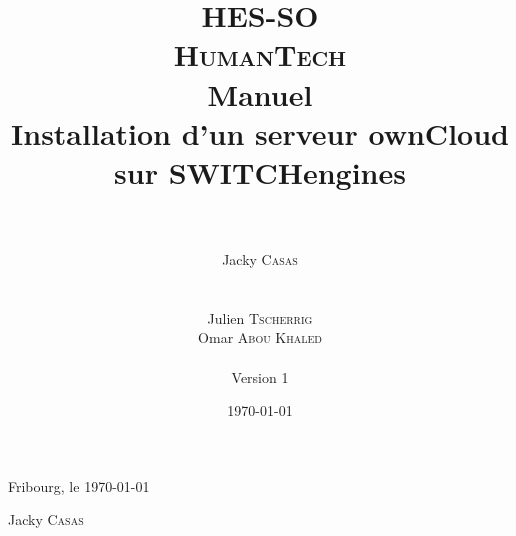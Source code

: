 \documentclass[a4paper, 12pt]{report}
\title{\huge{HES-SO} \\ \Huge{\textbf{\textsc{HumanTech}}} \\
\vspace{2cm} \huge{\textbf{Manuel}} \\ 
\huge{Installation d'un serveur ownCloud sur SWITCHengines}}
\author{\\ \\ Jacky \textsc{Casas} \\
\\ \\
Julien \textsc{Tscherrig} \\
Omar \textsc{Abou Khaled} \\
\\
\footnotesize{Version 1}}
\date{\today}
\begin{document}
\maketitle %
\newpage

\tableofcontents
\newpage

%


%
%


\vspace{3cm}
Fribourg, le \today

\vspace{1cm}

\hspace{11cm} Jacky \textsc{Casas}

\vspace{2cm}


%
\end{document}
